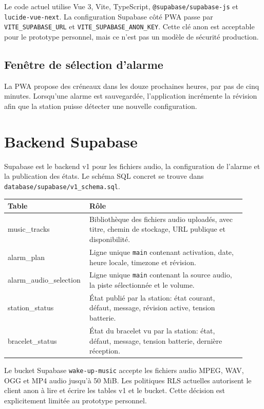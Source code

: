 \documentclass[11pt,a4paper]{article}
\begin{document}
Le code actuel utilise Vue 3, Vite, TypeScript, \texttt{@supabase/supabase-js} et \texttt{lucide-vue-next}. La configuration Supabase côté PWA passe par \texttt{VITE\_SUPABASE\_URL} et \texttt{VITE\_SUPABASE\_ANON\_KEY}. Cette clé anon est acceptable pour le prototype personnel, mais ce n'est pas un modèle de sécurité production.

\subsection{Fenêtre de sélection d'alarme}

La PWA propose des créneaux dans les douze prochaines heures, par pas de cinq minutes. Lorsqu'une alarme est sauvegardée, l'application incrémente la révision afin que la station puisse détecter une nouvelle configuration.

\section{Backend Supabase}

Supabase est le backend v1 pour les fichiers audio, la configuration de l'alarme et la publication des états. Le schéma SQL concret se trouve dans \texttt{database/supabase/v1\_schema.sql}.

\begin{longtable}{>{\ttfamily}p{0.28\linewidth}p{0.64\linewidth}}
\toprule
\normalfont Table & Rôle \\
\midrule
\endhead
music\_tracks & Bibliothèque des fichiers audio uploadés, avec titre, chemin de stockage, URL publique et disponibilité. \\
alarm\_plan & Ligne unique \texttt{main} contenant activation, date, heure locale, timezone et révision. \\
alarm\_audio\_selection & Ligne unique \texttt{main} contenant la source audio, la piste sélectionnée et le volume. \\
station\_status & État publié par la station: état courant, défaut, message, révision active, tension batterie. \\
bracelet\_status & État du bracelet vu par la station: état, défaut, message, tension batterie, dernière réception. \\
\bottomrule
\end{longtable}

Le bucket Supabase \texttt{wake-up-music} accepte les fichiers audio MPEG, WAV, OGG et MP4 audio jusqu'à 50 MiB. Les politiques RLS actuelles autorisent le client anon à lire et écrire les tables v1 et le bucket. Cette décision est explicitement limitée au prototype personnel.
\end{document}
